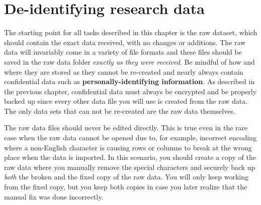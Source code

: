 
\section{De-identifying research data}

The starting point for all tasks described in this chapter is the raw dataset,
which should contain the exact data received, with no changes or additions.
The raw data will invariably come in a variety of file formats and these files
should be saved in the raw data folder \textit{exactly as they were
received}. Be mindful of how and where they are stored as they cannot be
re-created and nearly always contain confidential data such as
\textbf{personally-identifying information}.
As described in the previous chapter, confidential data must always be
encrypted and be
properly backed up since every other data file you will use is created from the
raw data. The only data sets that can not be re-created are the raw data
themselves.

The raw data files should never be edited directly. This is true even in the
rare case when the raw data cannot be opened due to, for example, incorrect
encoding where a non-English character is causing rows or columns to break at the
wrong place when the data is imported. In this scenario, you should create a
copy of the raw data where you manually remove the special characters and
securely back up \textit{both} the broken and the fixed copy of the raw data.
You will only keep working from the fixed copy, but you keep both copies in
case you later realize that the manual fix was done incorrectly.


